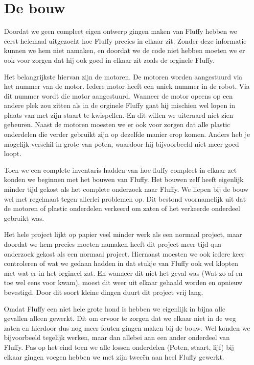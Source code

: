 \chapter{De bouw}
Doordat we geen compleet eigen ontwerp gingen maken van Fluffy hebben we eerst helemaal uitgezocht hoe Fluffy precies in elkaar zit. Zonder deze informatie kunnen we hem niet namaken, en doordat we de code niet hebben moeten we er ook voor zorgen dat hij ook goed in elkaar zit zoals de orginele Fluffy. 

Het belangrijkste hiervan zijn de motoren. De motoren worden aangestuurd via het nummer van de motor. Iedere motor heeft een uniek nummer in de robot. Via dit nummer wordt die motor aangestuurd. Wanneer de motor opeens op een andere plek zou zitten als in de orginele Fluffy gaat hij mischien wel lopen in plaats van met zijn staart te kwispellen. En dit willen we uiteraard niet zien gebeuren. 
Naast de motoren moesten we er ook voor zorgen dat alle plastic onderdelen die verder gebruikt zijn op dezelfde manier erop komen. Anders heb je mogelijk verschil in grote van poten, waardoor hij bijvoorbeeld niet meer goed loopt. 

Toen we een complete inventaris hadden van hoe fluffy compleet in elkaar zet konden we beginnen met het bouwen van Fluffy. Het bouwen zelf heeft eigenlijk minder tijd gekost als het complete onderzoek naar Fluffy. We liepen bij de bouw wel met regelmaat tegen allerlei problemen op. Dit bestond voornamelijk uit dat de motoren of plastic onderdelen verkeerd om zaten of het verkeerde onderdeel gebruikt was.

Het hele project lijkt op papier veel minder werk als een normaal project, maar doordat we hem precies moeten namaken heeft dit project meer tijd qua onderzoek gekost als een normaal project. Hiernaast moesten we ook iedere keer controleren of wat we gedaan hadden in dat stukje van Fluffy ook wel klopten met wat er in het orgineel zat. En wanneer dit niet het geval was (Wat zo af en toe wel eens voor kwam), moest dit weer uit elkaar gehaald worden en opnieuw bevestigd. Door dit soort kleine dingen duurt dit project vrij lang.

Omdat Fluffy een niet hele grote hond is hebben we eigenlijk in bijna alle gevallen alleen gewerkt. Dit om ervoor te zorgen dat we elkaar niet in de weg zaten en hierdoor dus nog meer fouten gingen maken bij de bouw. Wel konden we bijvoorbeeld tegelijk werken, maar dan allebei aan een ander onderdeel van Fluffy. Pas op het eind toen we alle lossen onderdelen (Poten, staart, lijf) bij elkaar gingen voegen hebben we met zijn twee\"{e}n aan heel Fluffy gewerkt.
